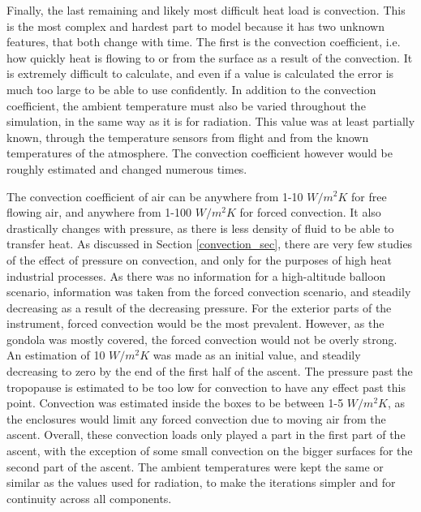 Finally, the last remaining and likely most difficult heat load is convection. This is the most complex and hardest part to model because it has two unknown features, that both change with time. The first is the convection coefficient, i.e. how quickly heat is flowing to or from the surface as a result of the convection. It is extremely difficult to calculate, and even if a value is calculated the error is much too large to be able to use confidently. In addition to the convection coefficient, the ambient temperature must also be varied throughout the simulation, in the same way as it is for radiation. This value was at least partially known, through the temperature sensors from flight and from the known temperatures of the atmosphere. The convection coefficient however would be roughly estimated and changed numerous times.

The convection coefficient of air can be anywhere from 1-10 $W/m^2K$ for free flowing air, and anywhere from 1-100 $W/m^2K$ for forced convection. It also drastically changes with pressure, as there is less density of fluid to be able to transfer heat. As discussed in Section \ref{convection_sec}, there are very few studies of the effect of pressure on convection, and only for the purposes of high heat industrial processes. As there was no information for a high-altitude balloon scenario, information was taken from the forced convection scenario, and steadily decreasing as a result of the decreasing pressure. For the exterior parts of the instrument, forced convection would be the most prevalent. However, as the gondola was mostly covered, the forced convection would not be overly strong. An estimation of 10 $W/m^2K$ was made as an initial value, and steadily decreasing to zero by the end of the first half of the ascent. The pressure past the tropopause is estimated to be too low for convection to have any effect past this point. Convection was estimated inside the boxes to be between 1-5 $W/m^2K$, as the enclosures would limit any forced convection due to moving air from the ascent. Overall, these convection loads only played a part in the first part of the ascent, with the exception of some small convection on the bigger surfaces for the second part of the ascent. The ambient temperatures were kept the same or similar as the values used for radiation, to make the iterations simpler and for continuity across all components.

